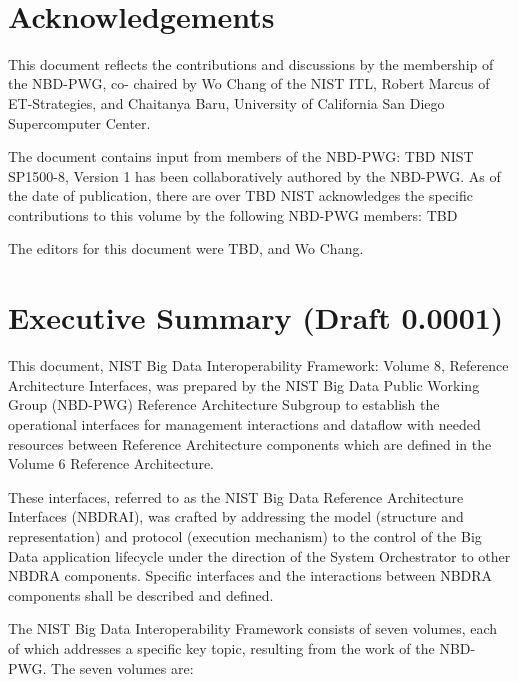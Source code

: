 \documentclass[11pt]{article}
\begin{document}
 
\section*{Acknowledgements}

This document reflects the contributions and discussions by the membership of the NBD-PWG, co-
chaired by Wo Chang of the NIST ITL, Robert Marcus of ET-Strategies, and Chaitanya Baru, University 
of California San Diego Supercomputer Center. 

The document contains input from members of the NBD-PWG: TBD
NIST SP1500-8, Version 1 has been collaboratively authored by the NBD-PWG. As of the date of 
publication, there are over TBD
NIST acknowledges the specific contributions  to this volume by the following NBD-PWG members:
TBD

The editors for this document were TBD, and Wo Chang.

\newpage
{}

\section{Executive Summary (Draft 0.0001)}

This document, NIST Big Data Interoperability Framework: Volume 8, Reference Architecture Interfaces, 
was prepared by the NIST Big Data Public Working Group (NBD-PWG) Reference Architecture 
Subgroup to establish the operational interfaces for management interactions and dataflow with needed 
resources between Reference Architecture components which are defined in the Volume 6 Reference 
Architecture. 

These interfaces, referred to as the NIST Big Data Reference Architecture Interfaces (NBDRAI), was 
crafted by addressing the model (structure and representation) and protocol (execution mechanism) to the 
control of the Big Data application lifecycle under the direction of the System Orchestrator to other 
NBDRA components. Specific interfaces and the interactions between NBDRA components shall be 
described and defined.

The NIST Big Data Interoperability Framework consists of seven volumes, each of which addresses a 
specific key topic, resulting from the work of the NBD-PWG. The seven volumes are:
\end{document}
